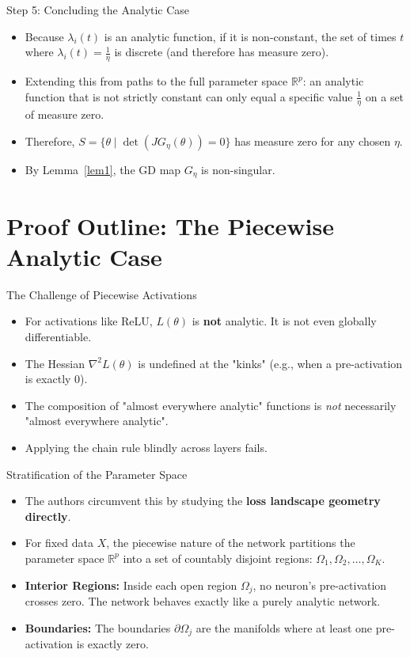 \documentclass[10pt, aspectratio=169]{beamer}
\theoremstyle{definition}
\begin{document}
\begin{frame}{Step 5: Concluding the Analytic Case}
    \begin{itemize}
        \item Because $\lambda_i(t)$ is an analytic function, if it is non-constant, the set of times $t$ where $\lambda_i(t) = \frac{1}{\eta}$ is discrete (and therefore has measure zero).
        \item Extending this from paths to the full parameter space $\mathbb{R}^p$: an analytic function that is not strictly constant can only equal a specific value $\frac{1}{\eta}$ on a set of measure zero.
        \item Therefore, $S = \{\theta \mid \det(J G_\eta(\theta)) = 0\}$ has measure zero for any chosen $\eta$.
        \item By Lemma~\ref{lem1}, the GD map $G_\eta$ is non-singular.
    \end{itemize}
\end{frame}

\section{Proof Outline: The Piecewise Analytic Case}

\begin{frame}{The Challenge of Piecewise Activations}
    \begin{itemize}
        \item For activations like ReLU, $L(\theta)$ is \textbf{not} analytic. It is not even globally differentiable.
        \item The Hessian $\nabla^2 L(\theta)$ is undefined at the "kinks" (e.g., when a pre-activation is exactly 0).
        \item The composition of "almost everywhere analytic" functions is \textit{not} necessarily "almost everywhere analytic". 
        \item Applying the chain rule blindly across layers fails.
    \end{itemize}
\end{frame}

\begin{frame}{Stratification of the Parameter Space}
    \begin{itemize}
        \item The authors circumvent this by studying the \textbf{loss landscape geometry directly}.
        \item For fixed data $X$, the piecewise nature of the network partitions the parameter space $\mathbb{R}^p$ into a set of countably disjoint regions: $\Omega_1, \Omega_2, \dots, \Omega_K$.
        \item \textbf{Interior Regions:} Inside each open region $\Omega_j$, no neuron's pre-activation crosses zero. The network behaves exactly like a purely analytic network.
        \item \textbf{Boundaries:} The boundaries $\partial \Omega_j$ are the manifolds where at least one pre-activation is exactly zero.
    \end{itemize}
\end{frame}
\end{document}

